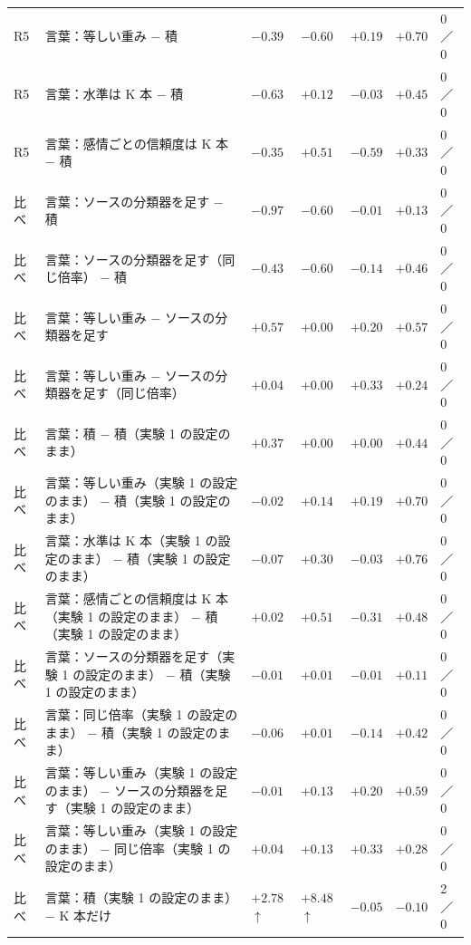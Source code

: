 \begin{longtable}{>{\raggedright}p{0.75cm}>{\raggedright}p{5.6cm}>{\raggedright}p{2.05cm}>{\raggedright}p{2.05cm}>{\raggedright}p{2.05cm}>{\raggedright}p{2.05cm}p{0.75cm}}
\midrule
R5 & 言葉：等しい重み − 積 & $-0.39$ & $-0.60$ & $+0.19$ & $+0.70$ & 0／0 \\
R5 & 言葉：水準は K 本 − 積 & $-0.63$ & $+0.12$ & $-0.03$ & $+0.45$ & 0／0 \\
R5 & 言葉：感情ごとの信頼度は K 本 − 積 & $-0.35$ & $+0.51$ & $-0.59$ & $+0.33$ & 0／0 \\
比べ & 言葉：ソースの分類器を足す − 積 & $-0.97$ & $-0.60$ & $-0.01$ & $+0.13$ & 0／0 \\
比べ & 言葉：ソースの分類器を足す（同じ倍率） − 積 & $-0.43$ & $-0.60$ & $-0.14$ & $+0.46$ & 0／0 \\
比べ & 言葉：等しい重み − ソースの分類器を足す & $+0.57$ & $+0.00$ & $+0.20$ & $+0.57$ & 0／0 \\
比べ & 言葉：等しい重み − ソースの分類器を足す（同じ倍率） & $+0.04$ & $+0.00$ & $+0.33$ & $+0.24$ & 0／0 \\
比べ & 言葉：積 − 積（実験 1 の設定のまま） & $+0.37$ & $+0.00$ & $+0.00$ & $+0.44$ & 0／0 \\
比べ & 言葉：等しい重み（実験 1 の設定のまま） − 積（実験 1 の設定のまま） & $-0.02$ & $+0.14$ & $+0.19$ & $+0.70$ & 0／0 \\
比べ & 言葉：水準は K 本（実験 1 の設定のまま） − 積（実験 1 の設定のまま） & $-0.07$ & $+0.30$ & $-0.03$ & $+0.76$ & 0／0 \\
比べ & 言葉：感情ごとの信頼度は K 本（実験 1 の設定のまま） − 積（実験 1 の設定のまま） & $+0.02$ & $+0.51$ & $-0.31$ & $+0.48$ & 0／0 \\
比べ & 言葉：ソースの分類器を足す（実験 1 の設定のまま） − 積（実験 1 の設定のまま） & $-0.01$ & $+0.01$ & $-0.01$ & $+0.11$ & 0／0 \\
比べ & 言葉：同じ倍率（実験 1 の設定のまま） − 積（実験 1 の設定のまま） & $-0.06$ & $+0.01$ & $-0.14$ & $+0.42$ & 0／0 \\
比べ & 言葉：等しい重み（実験 1 の設定のまま） − ソースの分類器を足す（実験 1 の設定のまま） & $-0.01$ & $+0.13$ & $+0.20$ & $+0.59$ & 0／0 \\
比べ & 言葉：等しい重み（実験 1 の設定のまま） − 同じ倍率（実験 1 の設定のまま） & $+0.04$ & $+0.13$ & $+0.33$ & $+0.28$ & 0／0 \\
比べ & 言葉：積（実験 1 の設定のまま） − K 本だけ & $+2.78$$\uparrow$ & $+8.48$$\uparrow$ & $-0.05$ & $-0.10$ & 2／0 \\
\midrule
\end{longtable}
